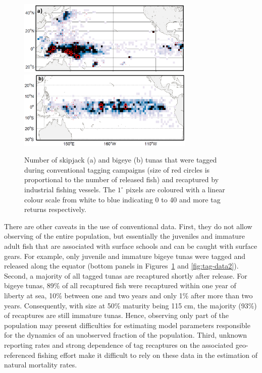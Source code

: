 \begin{figure}[H]
  \centering
  \includegraphics[width=0.75\textwidth]{chapter4/figs/tag-recaptures-skj}\\          
  \includegraphics[width=0.75\textwidth]{chapter4/figs/tag-recaptures-bet}
  \caption{Number of skipjack (a) and bigeye (b) tunas that were tagged during conventional tagging campaigns (size of red circles is proportional to the number of released fish) and recaptured by industrial fishing vessels. The $1^{\circ}$ pixels are coloured with a linear colour scale from white to blue indicating 0 to 40 and more tag returns respectively.}
  \label{fig:tag-data1}
\end{figure}

There are other caveats in the use of conventional data. First, they do not allow observing of the entire population, but essentially the juveniles and immature adult fish that are associated with surface schools and can be caught with surface gears. For example, only juvenile and immature bigeye tunas were tagged and released along the equator (bottom panels in Figures~\ref{fig:tag-data1} and \ref{fig:tag-data2}). Second, a majority of all tagged tunas are recaptured shortly after release. For bigeye tunas, 89\% of all recaptured fish were recaptured within one year of liberty at sea, 10\% between one and two years and only 1\% after more than two years. Consequently, with size at 50\% maturity being 115 cm, the majority (93\%) of recaptures are still immature tunas. Hence, observing only part of the population may present difficulties for estimating model parameters responsible for the dynamics of an unobserved fraction of the population. Third, unknown reporting rates and strong dependence of tag recaptures on the associated geo-referenced fishing effort make it difficult to rely on these data in the estimation of natural mortality rates.

